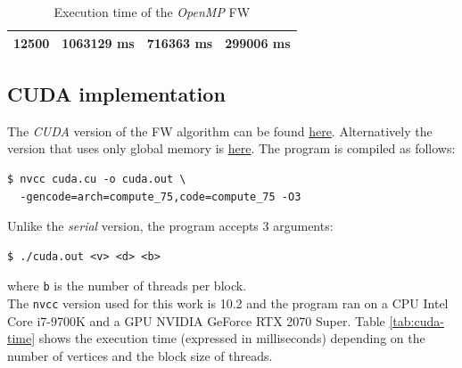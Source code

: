 \begin{table}[h!]
\begin{tabular}{|r|r|r|r|}
12500                                                                                  & 1063129 ms                                                                                     & 716363 ms                                                                                       & 299006 ms                                                                                       \\ \hline
\end{tabular}
\caption{Execution time of the \emph{OpenMP} FW}                                                                                                                                            
\label{tab:omp-time}
\end{table}

\subsection{CUDA implementation}
The \emph{CUDA} version of the FW algorithm can be found \href{https://github.com/firaja/Parallel-FloydWarshall/blob/master/cuda.cu}{here}. Alternatively the version 
that uses only global memory is \href{https://github.com/firaja/Parallel-FloydWarshall/blob/master/cuda2.cu}{here}.
The program is compiled as follows:
\begin{lstlisting}[basicstyle=\footnotesize\ttfamily]
$ nvcc cuda.cu -o cuda.out \
  -gencode=arch=compute_75,code=compute_75 -O3
\end{lstlisting}
Unlike the \emph{serial} version, the program accepts 3 arguments:
\begin{lstlisting}[basicstyle=\footnotesize\ttfamily]
$ ./cuda.out <v> <d> <b>
\end{lstlisting}
where \texttt{b} is the number of threads per block. \\
The \texttt{nvcc} version used for this work is 10.2 and the program ran on a CPU Intel Core i7-9700K and a GPU NVIDIA GeForce RTX 2070 Super.
Table \ref*{tab:cuda-time} shows the execution time (expressed in milliseconds) depending on the number of vertices and the block size of threads.


